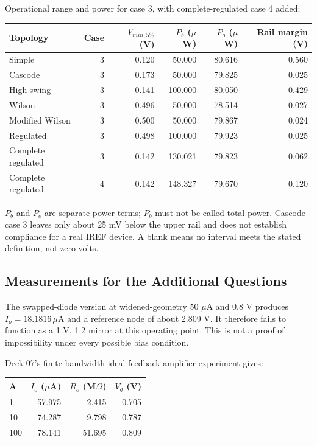 Operational range and power for case 3, with complete-regulated case 4 added:

\begin{center}\small
\begin{tabular}{lrrrrr}
\toprule
Topology & Case & $V_{min,5\%}$ (V) & $P_b$ ($\mu$W) & $P_o$ ($\mu$W) & Rail margin (V) \\
\midrule
Simple & 3 & 0.120 & 50.000 & 80.616 & 0.560 \\
Cascode & 3 & 0.173 & 50.000 & 79.825 & 0.025 \\
High-swing & 3 & 0.141 & 100.000 & 80.050 & 0.429 \\
Wilson & 3 & 0.496 & 50.000 & 78.514 & 0.027 \\
Modified Wilson & 3 & 0.500 & 50.000 & 79.867 & 0.024 \\
Regulated & 3 & 0.498 & 100.000 & 79.923 & 0.025 \\
Complete regulated & 3 & 0.142 & 130.021 & 79.823 & 0.062 \\
Complete regulated & 4 & 0.142 & 148.327 & 79.670 & 0.120 \\
\bottomrule
\end{tabular}
\end{center}

$P_b$ and $P_o$ are separate power terms; $P_b$ must not be called total power. Cascode case 3 leaves only about 25 mV below the upper rail and does not establish compliance for a real IREF device. A blank means no interval meets the stated definition, not zero volts.

\subsection{Measurements for the Additional Questions}
The swapped-diode version at widened-geometry 50 $\mu$A and 0.8 V produces $I_o=18.1816\,\mu$A and a reference node of about 2.809 V. It therefore fails to function as a 1 V, 1:2 mirror at this operating point. This is not a proof of impossibility under every possible bias condition.

Deck 07's finite-bandwidth ideal feedback-amplifier experiment gives:

\begin{center}\small
\begin{tabular}{lrrr}
\toprule
A & $I_o$ ($\mu$A) & $R_o$ (M$\Omega$) & $V_g$ (V) \\
\midrule
1 & 57.975 & 2.415 & 0.705 \\
10 & 74.287 & 9.798 & 0.787 \\
100 & 78.141 & 51.695 & 0.809 \\
\bottomrule
\end{tabular}
\end{center}

